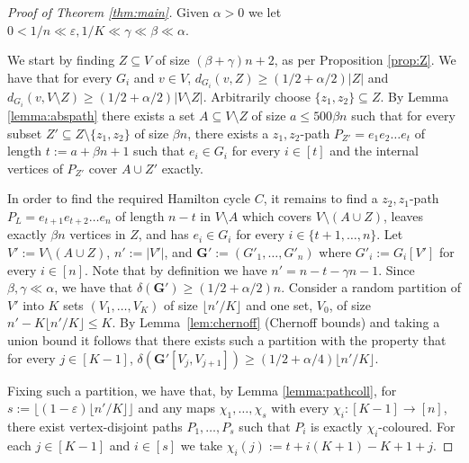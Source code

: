 \documentclass[11pt, dvipsnames]{amsart}
\theoremstyle{plain}
\theoremstyle{definition}
\newcommand{\eps}{\varepsilon}
\begin{document}
\begin{proof}[Proof of Theorem \ref{thm:main}] Given $\alpha>0$ we let $0<1/n\ll \eps,1/K \ll \gamma \ll \beta \ll \alpha$. 

We start by finding $Z\subseteq V$ of size $(\beta + \gamma)n+2$, as per Proposition \ref{prop:Z}. We have that for every $G_i$ and $v \in V$, $ d_{G_i}(v,Z) \geq (1/2+\alpha/2)|Z|$ and $ d_{G_i}(v,V\setminus Z) \geq (1/2+\alpha/2)|V\setminus Z|$. Arbitrarily choose $\{z_1, z_2\} \subseteq Z$. By Lemma \ref{lemma:abspath} there exists a set $A \subseteq V \setminus Z$ of size $a \leq 500\beta n$ such that for every subset $Z' \subseteq Z\setminus\{z_1,z_2\}$ of size $\beta n$, there exists a $z_1,z_2$-path $P_{Z'}=e_1e_2\ldots e_t$ of length $t:=a+\beta n +1$ such that $e_i \in G_i$ for every $i \in [t]$ and the internal vertices of $P_{Z'}$ cover $A\cup Z'$ exactly.

In order to find the required Hamilton cycle $C$, it remains to find a $z_2, z_1$-path $P_L=e_{t+1}e_{t+2}\ldots e_n$ of length $n-t$ in $V\setminus A$  which covers $V\setminus (A \cup Z)$, leaves exactly $\beta n$ vertices in $Z$, and has  $e_i \in G_i$ for every $i \in \{t+1, \ldots, n\}$. Let $V':=V\setminus (A \cup Z)$, $n':=|V'|$, and $\mathbf{G'}:=(G'_1, \ldots, G'_n)$ where $G'_i:=G_i[V']$ for every $i \in [n]$. Note that by definition we have $n'=n-t-\gamma n-1$. Since $\beta, \gamma \ll \alpha$, we have that $\delta(\mathbf{G'}) \geq (1/2+\alpha/2)n$. Consider a random partition of $V'$ into $K$ sets $(V_1, \ldots, V_K)$ of size $\lfloor{n'/K}\rfloor$ and one set, $V_0$, of size $n'-K\lfloor{n'/K}\rfloor \leq K$. By Lemma~\ref{lem:chernoff} (Chernoff bounds) 
and taking a union bound it follows that there exists such a partition with the property that for every $j \in [K-1]$, $\delta(\mathbf{G'}[V_j, V_{j+1}]) \geq (1/2 + \alpha/4)\lfloor{n'/K}\rfloor$.

Fixing such a partition, we have that, by Lemma \ref{lemma:pathcoll}, for $s :=\lfloor (1-\eps)\lfloor n'/K\rfloor \rfloor$ and any maps $\chi_1, \ldots, \chi_s$ with every $\chi_i:[K-1] \rightarrow [n]$, there exist vertex-disjoint paths $P_1, \ldots, P_s$ such that $P_i$ is exactly $\chi_i$-coloured. For each $j\in [K-1]$ and $i\in [s]$ we take %
$\chi_i(j):=t+i(K+1)-K+1+j$.


\end{proof}
\end{document}
